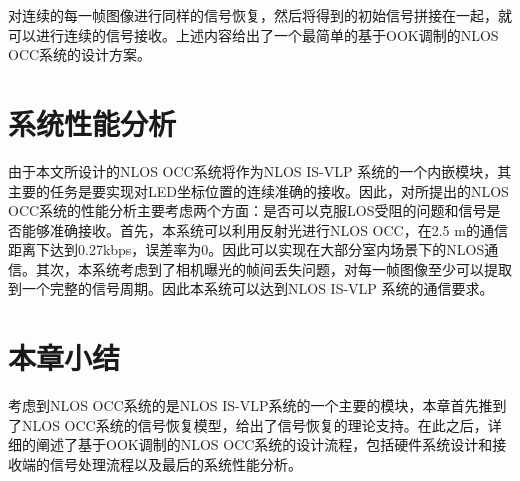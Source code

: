 对连续的每一帧图像进行同样的信号恢复，然后将得到的初始信号拼接在一起，就可以进行连续的信号接收。上述内容给出了一个最简单的基于OOK调制的NLOS OCC系统的设计方案。

\section{系统性能分析}
由于本文所设计的NLOS OCC系统将作为NLOS IS-VLP 系统的一个内嵌模块，其主要的任务是要实现对LED坐标位置的连续准确的接收。因此，对所提出的NLOS OCC系统的性能分析主要考虑两个方面：是否可以克服LOS受阻的问题和信号是否能够准确接收。首先，本系统可以利用反射光进行NLOS OCC，在2.5 m的通信距离下达到0.27kbps，误差率为0。因此可以实现在大部分室内场景下的NLOS通信。其次，本系统考虑到了相机曝光的帧间丢失问题，对每一帧图像至少可以提取到一个完整的信号周期。因此本系统可以达到NLOS IS-VLP 系统的通信要求。


\section{本章小结}
 考虑到NLOS OCC系统的是NLOS IS-VLP系统的一个主要的模块，本章首先推到了NLOS OCC系统的信号恢复模型，给出了信号恢复的理论支持。在此之后，详细的阐述了基于OOK调制的NLOS OCC系统的设计流程，包括硬件系统设计和接收端的信号处理流程以及最后的系统性能分析。

